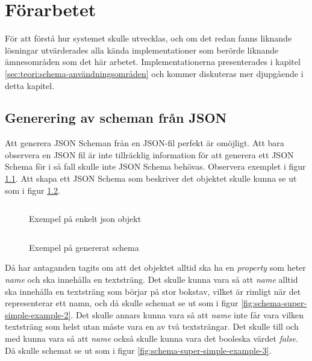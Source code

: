 \chapter{Förarbetet}
\label{sec:forarbete}
För att förstå hur systemet skulle utvecklas, och om det redan fanns liknande lösningar utvärderades alla kända implementationer som berörde liknande ämnesområden som det här arbetet. Implementationerna presenterades i kapitel \ref{sec:teori:schema-användningsområden} och kommer diskuteras mer djupgående i detta kapitel.

\section{Generering av scheman från JSON}
Att generera JSON Scheman från en JSON-fil perfekt är omöjligt. Att bara observera en JSON fil är inte tillräcklig information för att generera ett JSON Schema för i så fall skulle inte JSON Schema behövas. Observera exemplet i figur \ref{fig:json-super-simple-example}. Att skapa ett JSON Schema som beskriver det objektet skulle kunna se ut som i figur \ref{fig:schema-super-simple-example-1}. 

\begin{figure}
	\inputminted[tabsize=2, frame=single, fontsize=\small, framesep=2mm]{json}{code/schema-generation-example/json-file.json}
	\vspace{-1.7em}
	\caption{Exempel på enkelt json objekt}
	\label{fig:json-super-simple-example}
\end{figure}

\begin{figure}
	\inputminted[tabsize=2, frame=single, fontsize=\small, framesep=2mm]{json}{code/schema-generation-example/schema-example1.json}
	\vspace{-1.7em}
	\caption{Exempel på genererat schema}
	\label{fig:schema-super-simple-example-1}
\end{figure}

Då har antaganden tagits om att det objektet alltid ska ha en \textit{property} som heter \textit{name} och ska innehålla en textsträng. Det skulle kunna vara så att \textit{name} alltid ska innehålla en textsträng som börjar på stor bokstav, vilket är rimligt när det representerar ett namn, och då skulle schemat se ut som i figur \ref{fig:schema-super-simple-example-2}. Det skulle annars kunna vara så att \textit{name} inte får vara vilken textsträng som helst utan måste vara en av två textsträngar. Det skulle till och med kunna vara så att \textit{name} också skulle kunna vara det booleska värdet \textit{false}. Då skulle schemat se ut som i figur \ref{fig:schema-super-simple-example-3}.

